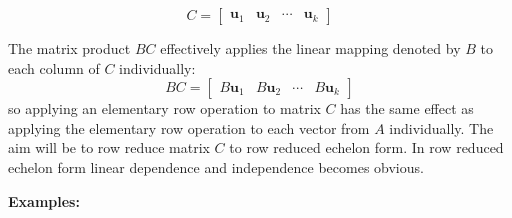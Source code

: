 \documentclass{article}
\begin{document}
\[C = \begin{bmatrix} \mathbf{u}_1 & \mathbf{u}_2 & \cdots & \mathbf{u}_k \end{bmatrix}\] 

The matrix product \(BC\) effectively applies the linear mapping denoted by \(B\) to each column of \(C\) individually: 
\[BC = \begin{bmatrix} B\mathbf{u}_1 & B\mathbf{u}_2 & \cdots & B\mathbf{u}_k \end{bmatrix}\]  
so applying an elementary row operation to matrix \(C\) has the same effect as applying the elementary row operation to each vector from \(A\) individually. The aim will be to row reduce matrix \(C\) to row reduced echelon form. In row reduced echelon form linear dependence and independence becomes obvious. 

\textbf{Examples:}
\end{document}
